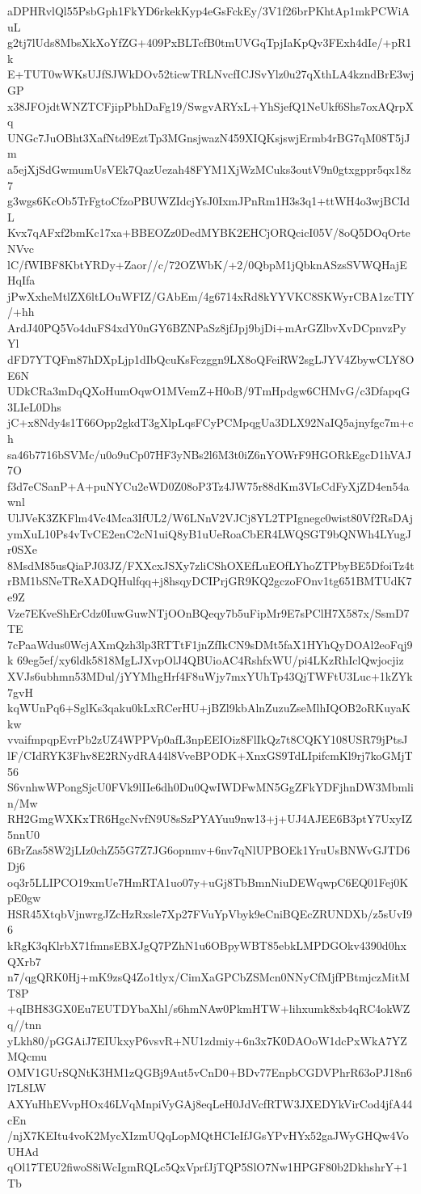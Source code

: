 aDPHRvlQl55PsbGph1FkYD6rkekKyp4eGsFckEy/3V1f26brPKhtAp1mkPCWiAuL
g2tj7lUds8MbsXkXoYfZG+409PxBLTcfB0tmUVGqTpjIaKpQv3FExh4dIe/+pR1k
E+TUT0wWKsUJfSJWkDOv52ticwTRLNvcfICJSvYlz0u27qXthLA4kzndBrE3wjGP
x38JFOjdtWNZTCFjipPbhDaFg19/SwgvARYxL+YhSjefQ1NeUkf6Shs7oxAQrpXq
UNGc7JuOBht3XafNtd9EztTp3MGnsjwazN459XIQKsjswjErmb4rBG7qM08T5jJm
a5ejXjSdGwmumUsVEk7QazUezah48FYM1XjWzMCuks3outV9n0gtxgppr5qx18z7
g3wgs6KcOb5TrFgtoCfzoPBUWZIdcjYsJ0IxmJPnRm1H3s3q1+ttWH4o3wjBCIdL
Kvx7qAFxf2bmKc17xa+BBEOZz0DedMYBK2EHCjORQcicI05V/8oQ5DOqOrteNVvc
lC/fWIBF8KbtYRDy+Zaor//c/72OZWbK/+2/0QbpM1jQbknASzsSVWQHajEHqIfa
jPwXxheMtlZX6ltLOuWFIZ/GAbEm/4g6714xRd8kYYVKC8SKWyrCBA1zcTIY/+hh
ArdJ40PQ5Vo4duFS4xdY0nGY6BZNPaSz8jfJpj9bjDi+mArGZlbvXvDCpnvzPyYl
dFD7YTQFm87hDXpLjp1dIbQcuKsFczggn9LX8oQFeiRW2sgLJYV4ZbywCLY8OE6N
UDkCRa3mDqQXoHumOqwO1MVemZ+H0oB/9TmHpdgw6CHMvG/c3DfapqG3LIeL0Dhs
jC+x8Ndy4s1T66Opp2gkdT3gXlpLqsFCyPCMpqgUa3DLX92NaIQ5ajnyfgc7m+ch
sa46b7716bSVMc/u0o9uCp07HF3yNBs2l6M3t0iZ6nYOWrF9HGORkEgcD1hVAJ7O
f3d7eCSanP+A+puNYCu2eWD0Z08oP3Tz4JW75r88dKm3VIsCdFyXjZD4en54awnl
UlJVeK3ZKFlm4Vc4Mca3IfUL2/W6LNnV2VJCj8YL2TPIgnegc0wist80Vf2RsDAj
ymXuL10Ps4vTvCE2enC2cN1uiQ8yB1uUeRoaCbER4LWQSGT9bQNWh4LYugJr0SXe
8MsdM85usQiaPJ03JZ/FXXcxJSXy7zliCShOXEfLuEOfLYhoZTPbyBE5DfoiTz4t
rBM1bSNeTReXADQHulfqq+j8hsqyDCIPrjGR9KQ2gczoFOnv1tg651BMTUdK7e9Z
Vze7EKveShErCdz0IuwGuwNTjOOnBQeqy7b5uFipMr9E7sPClH7X587x/SsmD7TE
7cPaaWdus0WcjAXmQzh3lp3RTTtF1jnZfIkCN9sDMt5faX1HYhQyDOAl2eoFqj9k
69eg5ef/xy6ldk5818MgLJXvpOlJ4QBUioAC4RshfxWU/pi4LKzRhIclQwjocjiz
XVJs6ubhmn53MDul/jYYMhgHrf4F8uWjy7mxYUhTp43QjTWFtU3Luc+1kZYk7gvH
kqWUnPq6+SglKs3qaku0kLxRCerHU+jBZl9kbAlnZuzuZseMlhIQOB2oRKuyaKkw
vvaifmpqpEvrPb2zUZ4WPPVp0afL3npEEIOiz8FlIkQz7t8CQKY108USR79jPtsJ
lF/CIdRYK3Fhv8E2RNydRA44l8VveBPODK+XnxGS9TdLIpifcmKl9rj7koGMjT56
S6vnhwWPongSjcU0FVk9lIIe6dh0Du0QwIWDFwMN5GgZFkYDFjhnDW3Mbmlin/Mw
RH2GmgWXKxTR6HgcNvfN9U8sSzPYAYuu9nw13+j+UJ4AJEE6B3ptY7UxyIZ5nnU0
6BrZas58W2jLIz0chZ55G7Z7JG6opnmv+6nv7qNlUPBOEk1YruUsBNWvGJTD6Dj6
oq3r5LLIPCO19xmUe7HmRTA1uo07y+uGj8TbBmnNiuDEWqwpC6EQ01Fej0KpE0gw
HSR45XtqbVjnwrgJZcHzRxsle7Xp27FVuYpVbyk9eCniBQEcZRUNDXb/z5sUvI96
kRgK3qKlrbX71fmnsEBXJgQ7PZhN1u6OBpyWBT85ebkLMPDGOkv4390d0hxQXrb7
n7/qgQRK0Hj+mK9zsQ4Zo1tlyx/CimXaGPCbZSMcn0NNyCfMjfPBtmjczMitMT8P
+qIBH83GX0Eu7EUTDYbaXhl/s6hmNAw0PkmHTW+lihxumk8xb4qRC4okWZq//tnn
yLkh80/pGGAiJ7EIUkxyP6vsvR+NU1zdmiy+6n3x7K0DAOoW1dcPxWkA7YZMQcmu
OMV1GUrSQNtK3HM1zQGBj9Aut5vCnD0+BDv77EnpbCGDVPhrR63oPJ18n6l7L8LW
AXYuHhEVvpHOx46LVqMnpiVyGAj8eqLeH0JdVcfRTW3JXEDYkVirCod4jfA44cEn
/njX7KEItu4voK2MycXIzmUQqLopMQtHCIeIfJGsYPvHYx52gaJWyGHQw4VoUHAd
qOl17TEU2fiwoS8iWcIgmRQLc5QxVprfJjTQP5SlO7Nw1HPGF80b2DkhshrY+1Tb
